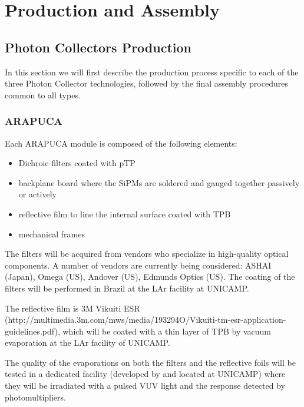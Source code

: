 \section{Production and Assembly}
\label{sec:fdsp-pd-prod-assy}

\subsection{Photon Collectors Production}
\label{sec:fdsp-pd-prod-pc}

In this section we will first describe the production process specific to each of the three Photon Collector technologies, followed by the final assembly procedures common to all types. 

\subsubsection{ARAPUCA}
\label{ssec:fdsp-pd-pc-prod-arapuca}

Each ARAPUCA module is composed of the following elements: 
\begin{itemize}
\item Dichroic filters coated with pTP 
\item backplane board where the SiPMs are soldered and ganged together passively or actively
\item reflective film to line the internal surface coated with TPB 
\item mechanical frames  
\end{itemize}

The filters will be acquired from vendors who specialize in high-quality optical components. A number of vendors are currently being considered: ASHAI (Japan), Omega (US), Andover (US), Edmunds Optics (US). The coating of the filters will be performed in Brazil at the LAr facility at UNICAMP.  

The reflective film is 3M Vikuiti ESR (http://multimedia.3m.com/mws/media/193294O/Vikuiti-tm-esr-application-guidelines.pdf), which will be coated with a thin layer of TPB by vacuum evaporation at the LAr facility of UNICAMP.  

The quality of the evaporations on both the filters and the reflective foils will be tested in a dedicated facility (developed by and located at UNICAMP) where they will be irradiated with a pulsed VUV light and the response detected by photomultipliers.   

